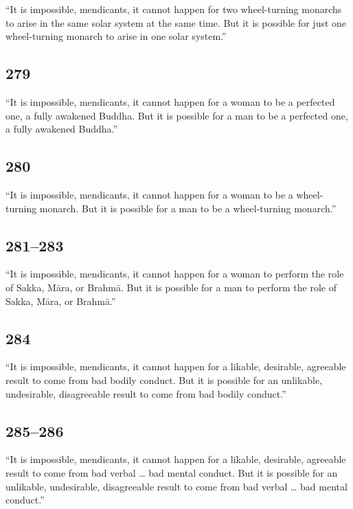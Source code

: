 \documentclass[12pt,openany]{book}%
\begin{document}
“It is impossible, mendicants, it cannot happen for two wheel-turning monarchs to arise in the same solar system at the same time. But it is possible for just one wheel-turning monarch to arise in one solar system.” 

\subsection*{279 }

“It is impossible, mendicants, it cannot happen for a woman to be a perfected one, a fully awakened Buddha. But it is possible for a man to be a perfected one, a fully awakened Buddha.” 

\subsection*{280 }

“It is impossible, mendicants, it cannot happen for a woman to be a wheel-turning monarch. But it is possible for a man to be a wheel-turning monarch.” 

\subsection*{281–283 }

“It is impossible, mendicants, it cannot happen for a woman to perform the role of Sakka, \textsanskrit{Māra}, or \textsanskrit{Brahmā}. But it is possible for a man to perform the role of Sakka, \textsanskrit{Māra}, or \textsanskrit{Brahmā}.” 

\subsection*{284 }

“It is impossible, mendicants, it cannot happen for a likable, desirable, agreeable result to come from bad bodily conduct. But it is possible for an unlikable, undesirable, disagreeable result to come from bad bodily conduct.” 

\subsection*{285–286 }

“It is impossible, mendicants, it cannot happen for a likable, desirable, agreeable result to come from bad verbal … bad mental conduct. But it is possible for an unlikable, undesirable, disagreeable result to come from bad verbal … bad mental conduct.” 
\end{document}
